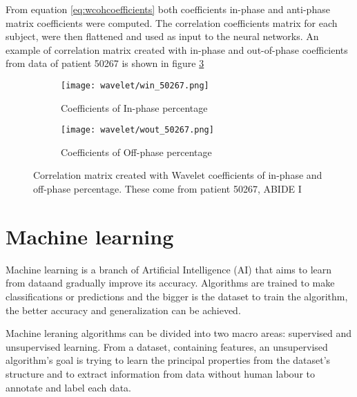 \documentclass[a4paper,11pt]{article}
\begin{document}
From equation \ref{eq:wcohcoefficients} both coefficients in-phase and anti-phase matrix coefficients were computed.
The correlation coefficients matrix for each subject, were then flattened and used as input to the neural networks.
An example of correlation matrix created with in-phase and out-of-phase coefficients from data of patient 50267 is shown in figure \ref{fig:win_wout_50267}




\begin{figure}
\begin{subfigure}{0.45\textwidth}
\texttt{[image: wavelet/win\_50267.png]}
\caption{Coefficients of In-phase percentage}
\label{}
\end{subfigure}
\begin{subfigure}{0.45\textwidth}
\texttt{[image: wavelet/wout\_50267.png]}
\caption{Coefficients of Off-phase percentage}
\label{}
\end{subfigure}
\caption{Correlation matrix created with Wavelet coefficients of in-phase and off-phase percentage. These come from patient 50267, ABIDE I }
\label{fig:win_wout_50267}
\end{figure}




\newpage

\section{Machine learning}
Machine learning is a branch of Artificial Intelligence (AI) that aims to learn from dataand gradually improve its accuracy.
Algorithms are trained to make classifications or predictions and the bigger is the dataset to train the algorithm, the better accuracy and generalization can be achieved.

Machine leraning algorithms can be divided into two macro areas: supervised and unsupervised learning.
From a dataset, containing features, an unsupervised algorithm's goal is trying to learn the principal properties from the dataset's structure and to extract information from data without human labour to annotate and label each data.
\end{document}
